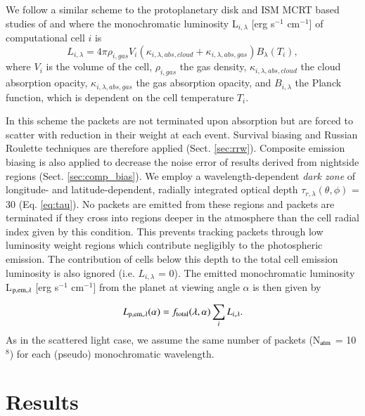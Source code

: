 \documentclass{aa}
\begin{document}
We follow a similar scheme to the protoplanetary disk and ISM MCRT based studies of \citet{Pinte2006} and \citet{Robitaille2011} where the monochromatic luminosity L$_{i, \lambda}$ [erg s$^{-1}$ cm$^{-1}$]  of computational cell $i$ is 
\begin{equation}
L_{i, \lambda} = 4\pi\rho_{i, gas}V_{i}(\kappa_{i, \lambda, abs, cloud} + \kappa_{i, \lambda, abs, gas})B_{\lambda} (T_{i}) , 
\end{equation}
where $V_{i}$ is the volume of the cell, $\rho_{i, gas}$ the gas density, $\kappa_{i, \lambda, abs, cloud}$ the cloud absorption opacity, $\kappa_{i, \lambda, abs, gas}$ the gas absorption opacity, and $B_{i, \lambda}$ the Planck function, which is dependent on the cell temperature $T_{i}$.

In this scheme the packets are not terminated upon absorption but are forced to scatter with reduction in their weight at each event.
Survival biasing and Russian Roulette techniques are therefore applied (Sect. \ref{sec:rrw}).
Composite emission biasing is also applied to decrease the noise error of results derived from nightside regions (Sect. \ref{sec:comp_bias}).
We employ a wavelength-dependent \textit{dark zone} \citep{Pinte2006} of longitude- and latitude-dependent, radially integrated optical depth $\tau_{r, \lambda}(\theta, \phi)$ = 30 (Eq. \ref{eq:tau}).
No packets are emitted from these regions and packets are terminated if they cross into regions deeper in the atmosphere than the cell radial index given by this condition.
This prevents tracking packets through low luminosity weight regions which contribute negligibly to the photospheric emission.
The contribution of cells below this depth to the total cell emission luminosity is also ignored (i.e. $L_{i, \lambda}$ = 0).
The emitted monochromatic luminosity L$_{\rm p, em, \lambda}$ [erg s$^{-1}$ cm$^{-1}$] from the planet at viewing angle $\alpha$ is then given by 

\begin{equation}
\label{eq:emitted}
L_{\rm p, em, \lambda}(\alpha) =  f_{\rm total}(\lambda, \alpha) \sum_{i} L_{i, \lambda}.
\end{equation}
As in the scattered light case, we assume the same number of packets (N$_{\rm atm}$ = 10$^{8}$) for  each (pseudo) monochromatic wavelength.

\section{Results}
\label{sec:Results}
\end{document}
